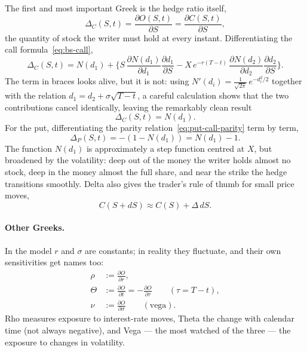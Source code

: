 The first and most important Greek is the hedge ratio itself,
\begin{equation}
\Delta_C(S,t) = \frac{\partial O(S,t)}{\partial S} = \frac{\partial C(S,t)}{\partial S},
\end{equation}
the quantity of stock the writer must hold at every instant.
Differentiating the call formula~\eqref{eq:bs-call},
\begin{equation}
\Delta_C(S,t) = N(d_1) + \biggl\{S\,\frac{\partial N(d_1)}{\partial d_1}\frac{\partial d_1}{\partial S} - X\, e^{-r(T-t)}\,\frac{\partial N(d_2)}{\partial d_2}\frac{\partial d_2}{\partial S}\biggr\}.
\end{equation}
The term in braces looks alive, but it is not: using $N'(d_i) = \frac{1}{\sqrt{2\pi}}\, e^{-d_i^2/2}$ together with the relation $d_1 = d_2 + \sigma\sqrt{T-t}$, a careful calculation shows that the two contributions cancel identically, leaving the remarkably clean result
\begin{equation}\label{eq:delta-call}
\Delta_C(S,t) = N(d_1).
\end{equation}
For the put, differentiating the parity relation~\eqref{eq:put-call-parity} term by term,
\begin{equation}\label{eq:delta-put}
\Delta_P(S,t) = -(1 - N(d_1)) = N(d_1) - 1.
\end{equation}
The function $N(d_1)$ is approximately a step function centred at $X$, but broadened by the volatility: deep out of the money the writer holds almost no stock, deep in the money almost the full share, and near the strike the hedge transitions smoothly.
Delta also gives the trader's rule of thumb for small price moves,
\begin{equation}
C(S+dS) \approx C(S) + \Delta\, dS.
\end{equation}

\paragraph*{Other Greeks.}

In the model $r$ and $\sigma$ are constants; in reality they fluctuate, and their own sensitivities get names too:
\begin{align}
\rho &:= \frac{\partial O}{\partial r}, \\[3pt]
\Theta &:= \frac{\partial O}{\partial t}=-\frac{\partial O}{\partial\tau} \qquad (\tau=T-t), \\[3pt]
\nu &:= \frac{\partial O}{\partial \sigma} \qquad (\text{vega}).
\end{align}
Rho measures exposure to interest-rate moves, Theta the change with calendar time (not always negative), and Vega --- the most watched of the three --- the exposure to changes in volatility.

